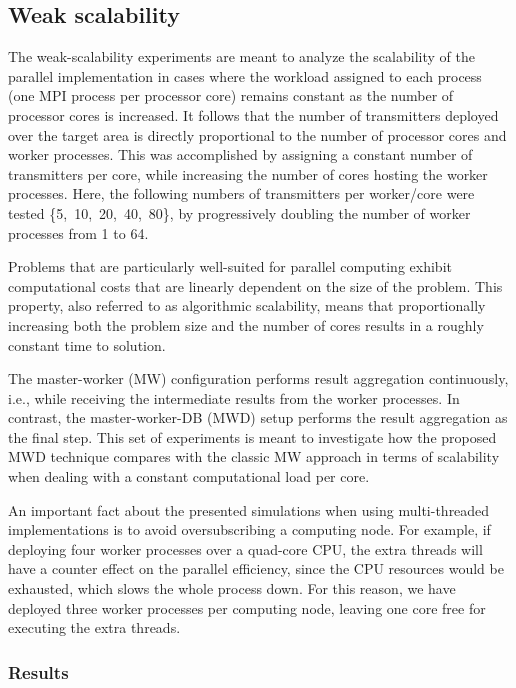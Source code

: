 \subsection{Weak scalability}

The weak-scalability experiments are meant to analyze the scalability
of the parallel implementation in cases where the workload assigned
to each process (one MPI process per processor core) remains constant
as the number of processor cores is increased. It follows that the
number of transmitters deployed over the target area is directly proportional
to the number of processor cores and worker processes. This was accomplished
by assigning a constant number of transmitters per core, while increasing
the number of cores hosting the worker processes. Here, the following
numbers of transmitters per worker/core were tested \{5,~10,~20,~40,~80\},
by progressively doubling the number of worker processes from 1 to
64.

Problems that are particularly well-suited for parallel computing
exhibit computational costs that are linearly dependent on the size
of the problem. This property, also referred to as algorithmic scalability,
means that proportionally increasing both the problem size and the
number of cores results in a roughly constant time to solution.

The master-worker (MW)
configuration performs result aggregation continuously, i.e., while
receiving the intermediate results from the worker processes. In contrast,
the master-worker-DB (MWD)
setup performs the result aggregation as the final step. This set
of experiments is meant to investigate how the proposed MWD technique
compares with the classic MW approach in terms of scalability when
dealing with a constant computational load per core.

An important fact about the presented simulations when using multi-threaded
implementations is to avoid oversubscribing a computing node. For
example, if deploying four worker processes over a quad-core CPU,
the extra threads will have a counter effect on the parallel efficiency,
since the CPU resources would be exhausted, which slows the whole
process down. For this reason, we have deployed three worker processes
per computing node, leaving one core free for executing the extra
threads. 


\subsubsection*{Results}

